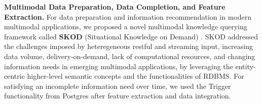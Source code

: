 %
%
\textbf{Multimodal Data Preparation, Data Completion, and Feature Extraction.}
For data preparation and information recommendation in modern multimodal applications, we proposed a novel multimodal knowledge querying framework %
called \textbf{SKOD} (Situational Knowledge on Demand) \cite{palacios2019wip, stonebraker2020surveillance}. SKOD addressed the challenges imposed by heteregeneous restful and streaming input, increasing data volume, delivery-on-demand, lack of computational resources, and changing information needs in emerging multimodal applications, by leveraging the entity-centric higher-level semantic concepts and the functionalities of RDBMS. For
satisfying an incomplete information need over time, we used the Trigger functionality from Postgres after feature extraction and data integration.

